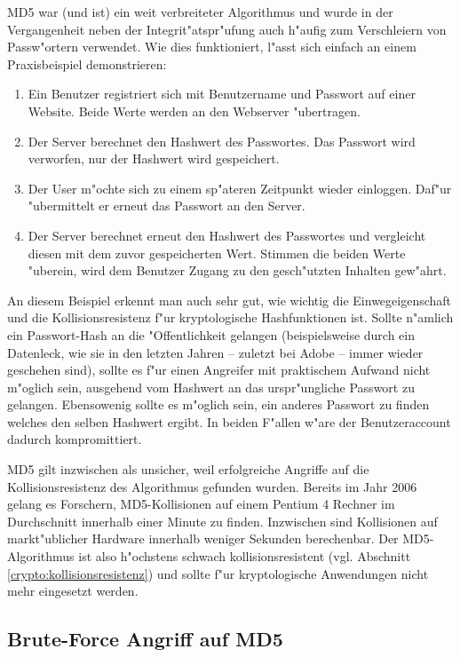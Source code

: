 \begin{refsection}
MD5 war (und ist) ein weit verbreiteter Algorithmus und wurde in der
Vergangenheit neben der Integrit"atspr"ufung auch h"aufig zum Verschleiern von
Passw"ortern verwendet.  Wie dies funktioniert, l"asst sich einfach an einem
Praxisbeispiel demonstrieren:

\begin{enumerate}
		\item Ein Benutzer registriert sich mit Benutzername und Passwort auf einer
			Website. Beide Werte werden an den Webserver "ubertragen.
		\item Der Server berechnet den Hashwert des Passwortes. Das Passwort wird
			verworfen, nur der Hashwert wird gespeichert.
		\item Der User m"ochte sich zu einem sp"ateren Zeitpunkt wieder einloggen.
			Daf"ur "ubermittelt er erneut das Passwort an den Server.
		\item Der Server berechnet erneut den Hashwert des Passwortes und
			vergleicht diesen mit dem zuvor gespeicherten Wert. Stimmen die beiden
			Werte "uberein, wird dem Benutzer Zugang zu den gesch"utzten Inhalten
			gew"ahrt.
\end{enumerate}

An diesem Beispiel erkennt man auch sehr gut, wie wichtig die Einwegeigenschaft
und die Kollisionsresistenz f"ur kryptologische Hashfunktionen ist. Sollte
n"amlich ein Passwort-Hash an die "Offentlichkeit gelangen (beispielsweise durch
ein Datenleck, wie sie in den letzten Jahren -- zuletzt bei Adobe -- immer
wieder geschehen sind), sollte es f"ur einen Angreifer mit praktischem Aufwand
nicht m"oglich sein, ausgehend vom Hashwert an das urspr"ungliche Passwort zu
gelangen. Ebensowenig sollte es m"oglich sein, ein anderes Passwort zu finden
welches den selben Hashwert ergibt. In beiden F"allen w"are der Benutzeraccount
dadurch kompromittiert.

MD5 gilt inzwischen als unsicher, weil erfolgreiche Angriffe auf die
Kollisionsresistenz des Algorithmus gefunden wurden. Bereits im Jahr 2006 gelang
es Forschern, MD5-Kollisionen auf einem Pentium 4 Rechner im Durchschnitt
innerhalb einer Minute zu finden\cite{crypto:stevens2006fast}. Inzwischen sind
Kollisionen auf markt"ublicher Hardware innerhalb weniger Sekunden berechenbar.
Der MD5-Algorithmus ist also h"ochstens schwach kollisionsresistent (vgl.
Abschnitt \ref{crypto:kollisionsresistenz}) und sollte f"ur kryptologische
Anwendungen nicht mehr eingesetzt werden.

\subsection{Brute-Force Angriff auf MD5}


\end{refsection}
